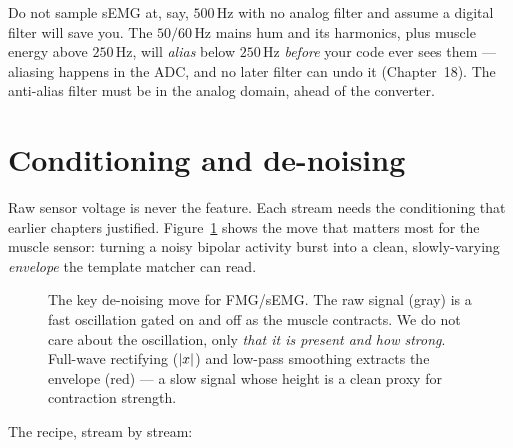 \begin{trapbox}
Do not sample sEMG at, say, $500\,$Hz with no analog filter and assume a digital
filter will save you. The $50/60\,$Hz mains hum and its harmonics, plus muscle
energy above $250\,$Hz, will \emph{alias} below $250\,$Hz \emph{before} your
code ever sees them --- aliasing happens in the ADC, and no later filter can
undo it (Chapter~18). The anti-alias filter must be in the analog domain, ahead
of the converter.
\end{trapbox}

\section{Conditioning and de-noising}
\label{ch41:conditioning}

Raw sensor voltage is never the feature. Each stream needs the conditioning that
earlier chapters justified. Figure~\ref{ch41:fig-emgenv} shows the move that
matters most for the muscle sensor: turning a noisy bipolar activity burst into
a clean, slowly-varying \emph{envelope} the template matcher can read.

\begin{figure}[H]
\centering
{}
\caption{The key de-noising move for FMG/sEMG. The raw signal (gray) is a fast
oscillation gated on and off as the muscle contracts. We do not care about the
oscillation, only \emph{that it is present and how strong}. Full-wave rectifying
($\lvert x\rvert$) and low-pass smoothing extracts the envelope (red) --- a slow signal
whose height is a clean proxy for contraction strength.}
\label{ch41:fig-emgenv}
\end{figure}

The recipe, stream by stream:

